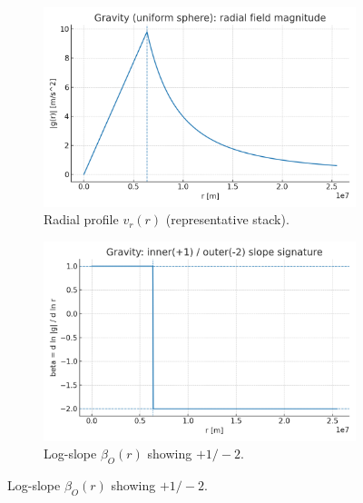 \documentclass[12pt,a4paper,oneside]{scrreprt}
\begin{document}
\begin{figure}[htbp]\centering
  \begin{subfigure}[t]{0.49\linewidth}
    \includegraphics[width=\linewidth]{fig/gravity_vr_profile.png}
    \caption{Radial profile $v_r(r)$ (representative stack).}
    \label{fig:grav:vr}
  \end{subfigure}\hfill
  \begin{subfigure}[t]{0.49\linewidth}
    \includegraphics[width=\linewidth]{fig/gravity_beta_signature.png}
    \caption{Log-slope $\beta_O(r)$ showing $+1/-2$.}
    \label{fig:grav:beta}
  \end{subfigure}


\end{figure}
\end{document}
